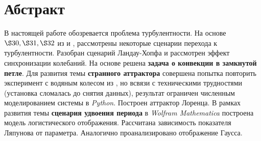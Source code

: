 \section*{Абстракт}

В настоящей работе обозревается проблема турбулентности. На основе $\S 30, \S 31, \S 32$ из \cite{LL6} и \cite{HS}, рассмотрены некоторые сценарии перехода к турбулентности. Разобран сценарий Ландау-Хопфа и рассмотрен эффект синхронизации колебаний. На основе \cite{Kuz} решена \textbf{задача о конвекции в замкнутой петле}. Для развития темы \textbf{странного аттрактора} совершена попытка повторить эксперимент с водяным колесом из \cite{water_wheel}, но всвязи с техническими трудностями (установка сломалась до снятия данных), результат ограничен численным моделированием системы в \textit{Python}. Построен аттрактор Лоренца. В рамках развития темы \textbf{сценария удвоения периода} в \textit{Wolfram Mathematica} построена модель логистического отображения. Рассчитана зависимость показателя Ляпунова от параметра. Аналогично проанализировано отображение Гаусса.